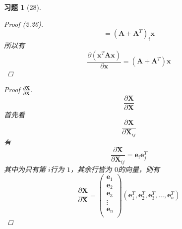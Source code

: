 \documentclass[a4paper, UTF8]{ctexart}
\newtheorem*{exercise}{\textbf{习题}}
\begin{document}
\begin{exercise}[28]
\begin{proof}[Proof (2.26)]
\begin{equation*}
		\end{equation*}
		\begin{equation*}
			= \left( \mathbf{A} + \mathbf{A}^T \right)_i \mathbf{x}
		\end{equation*}
		所以有
		\begin{equation*}
			\frac{\partial \left( \mathbf{x}^T \mathbf{A} \mathbf{x} \right)}{\partial \mathbf{x}} = \left( \mathbf{A} + \mathbf{A}^T \right) \mathbf{x}
		\end{equation*}
	\end{proof}
	\begin{proof}[Proof $\frac{\partial \mathbf{X}}{\partial \mathbf{X}}$]
		\begin{equation*}
			\frac{\partial \mathbf{X}}{\partial \mathbf{X}}
		\end{equation*}
		首先看
		\begin{equation*}
			\frac{\partial \mathbf{X}}{\partial \mathbf{X}_{ij}}
		\end{equation*}
		有
		\begin{equation*}
			\frac{\partial \mathbf{X}}{\partial \mathbf{X}_{ij}} = \mathbf{e}_i \mathbf{e}_j^T
		\end{equation*}
		其中为只有第 $i$行为 $1$，其余行皆为 $0$的向量，则有
		\begin{equation*}
			\frac{\partial \mathbf{X}}{\partial \mathbf{X}} = \left(
			\begin{array}{c}
				\mathbf{e}_1 \\
				\mathbf{e}_2 \\
				\mathbf{e}_3 \\
				\vdots       \\
				\mathbf{e}_n \\
			\end{array}
			\right) \left(
			\mathbf{e}_1^T, \mathbf{e}_2^T, \mathbf{e}_3^T, \dots, \mathbf{e}_n^T
			\right)
		\end{equation*}
	\end{proof}
\end{exercise}
\end{document}
